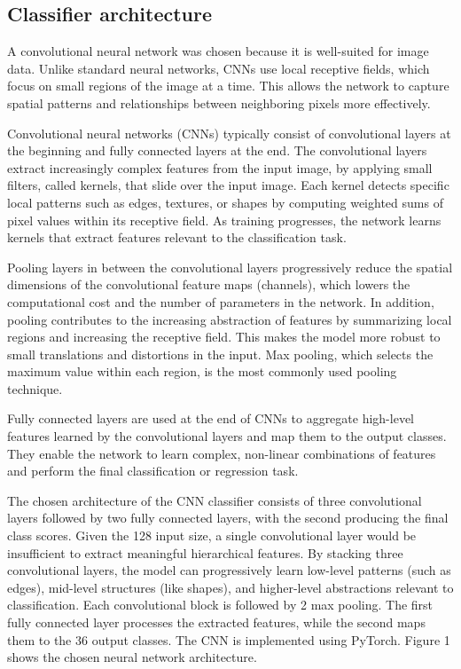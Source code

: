 \documentclass[a4, 10 pt, conference]{ieeeconf}  %
\begin{document}
\subsection{Classifier architecture}
\label{subsec:architecture}

A convolutional neural network was chosen because it is well-suited for image data. Unlike standard neural networks, CNNs use local receptive fields, which focus on small regions of the image at a time. This allows the network to capture spatial patterns and relationships between neighboring pixels more effectively.

Convolutional neural networks (CNNs) typically consist of convolutional layers at the beginning and fully connected layers at the end. The convolutional layers extract increasingly complex features from the input image, by applying small filters, called kernels, that slide over the input image. Each kernel detects specific local patterns such as edges, textures, or shapes by computing weighted sums of pixel values within its receptive field. As training progresses, the network learns kernels that extract features relevant to the classification task.

Pooling layers in between the convolutional layers progressively reduce the spatial dimensions of the convolutional feature maps (channels), which lowers the computational cost and the number of parameters in the network. In addition, pooling contributes to the increasing abstraction of features by summarizing local regions and increasing the receptive field. This makes the model more robust to small translations and distortions in the input. Max pooling, which selects the maximum value within each region, is the most commonly used pooling technique.

Fully connected layers are used at the end of CNNs to aggregate high-level features learned by the convolutional layers and map them to the output classes. They enable the network to learn complex, non-linear combinations of features and perform the final classification or regression task.

The chosen architecture of the CNN classifier consists of three convolutional layers followed by two fully connected layers, with the second producing the final class scores. Given the 128 input size, a single convolutional layer would be insufficient to extract meaningful hierarchical features. By stacking three convolutional layers, the model can progressively learn low-level patterns (such as edges), mid-level structures (like shapes), and higher-level abstractions relevant to classification. Each convolutional block is followed by 2 max pooling. The first fully connected layer processes the extracted features, while the second maps them to the 36 output classes.
The CNN is implemented using PyTorch. Figure 1 shows the chosen neural network architecture.
\end{document}
